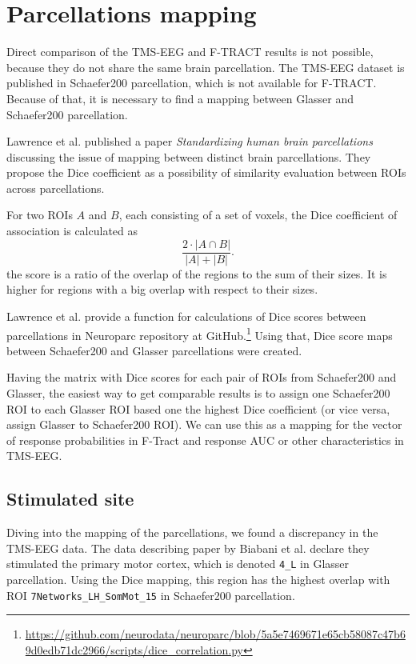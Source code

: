 \section{Parcellations mapping}\label{sec:dice}

Direct comparison of the TMS-EEG and F-TRACT results is not possible, because they do not share the same brain parcellation. The TMS-EEG dataset is published in Schaefer200 parcellation, which is not available for F-TRACT. Because of that, it is necessary to find a mapping between Glasser and Schaefer200 parcellation.

Lawrence et al. published a paper \textit{Standardizing human brain parcellations} \cite{lawrence_standardizing_2021} discussing the issue of mapping between distinct brain parcellations. They propose the Dice coefficient \cite{dice_measures_1945} as a possibility of similarity evaluation between ROIs across parcellations. 

For two ROIs $A$ and $B$, each consisting of a set of voxels, the Dice coefficient of association is calculated as  
$$
\frac{2 \cdot |A\cap B|}{|A|+|B|}.
$$
the score is a ratio of the overlap of the regions to the sum of their sizes. It is higher for regions with a big overlap with respect to their sizes.

Lawrence et al. provide a function for calculations of Dice scores between parcellations in Neuroparc repository at GitHub.\footnote{\url{https://github.com/neurodata/neuroparc/blob/5a5e7469671e65cb58087c47b69d0edb71dc2966/scripts/dice_correlation.py}} Using that, Dice score maps between Schaefer200 and Glasser parcellations were created.

Having the matrix with Dice scores for each pair of ROIs from Schaefer200 and Glasser, the easiest way to get comparable results is to assign one Schaefer200 ROI to each Glasser ROI based one the highest Dice coefficient (or vice versa, assign Glasser to Schaefer200 ROI). We can use this as a mapping for the vector of response probabilities in F-Tract and response AUC or other characteristics in TMS-EEG. 

\subsection{Stimulated site}\label{sec:parcellations-mapping-stimulated_roi}

Diving into the mapping of the parcellations, we found a discrepancy in the TMS-EEG data. The data describing paper by Biabani et al. \cite{biabani_characterizing_2019} declare they stimulated the primary motor cortex, which is denoted \texttt{4\_L} in Glasser parcellation. Using the Dice mapping, this region has the highest overlap with ROI \texttt{7Networks\_LH\_SomMot\_15} in Schaefer200 parcellation. 

